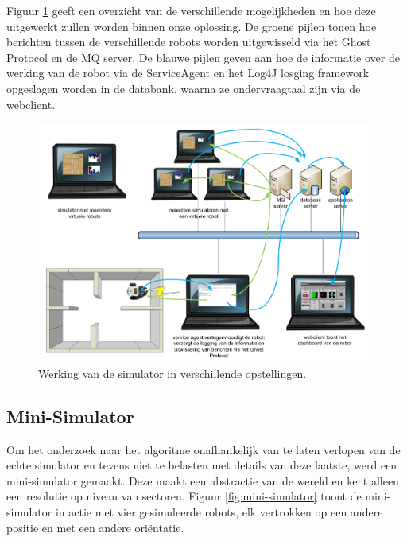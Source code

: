 \documentclass[12pt,a4paper]{report}
\begin{document}
Figuur \ref{fig:simulator-modi} geeft een overzicht van de verschillende mogelijkheden en hoe deze uitgewerkt zullen worden binnen onze oplossing. De groene pijlen tonen hoe berichten tussen de verschillende robots worden uitgewisseld via het Ghost Protocol en de MQ server. De blauwe pijlen geven aan hoe de informatie over de werking van de robot via de ServiceAgent en het Log4J losging framework opgeslagen worden in de databank, waarna ze ondervraagtaal zijn via de webclient.

\begin{figure}[htbp]
  \centering
  \includegraphics[width=200mm, angle=90]{resources/simulator-modi.png}
  \caption{Werking van de simulator in verschillende opstellingen.}
  \label{fig:simulator-modi}
\end{figure}

\subsection{Mini-Simulator}

Om het onderzoek naar het algoritme onafhankelijk van te laten verlopen van de echte simulator en tevens niet te belasten met details van deze laatste, werd een mini-simulator gemaakt. Deze maakt een abstractie van de wereld en kent alleen een resolutie op niveau van sectoren. Figuur \ref{fig:mini-simulator} toont de mini-simulator in actie met vier gesimuleerde robots, elk vertrokken op een andere positie en met een andere ori\"entatie.
\end{document}
